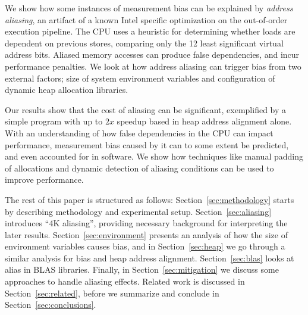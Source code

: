 \documentclass[10pt, conference, compsocconf]{IEEEtran}
\begin{document}
We show how some instances of measurement bias can be explained by \emph{address aliasing}, an artifact of a known Intel specific optimization on the out-of-order execution pipeline.
The CPU uses a heuristic for determining whether loads are dependent on previous stores, comparing only the 12 least significant virtual address bits.
Aliased memory accesses can produce false dependencies, and incur performance penalties.
We look at how address aliasing can trigger bias from two external factors; size of system environment variables and configuration of dynamic heap allocation libraries.

Our results show that the cost of aliasing can be significant, exemplified by a simple program with up to $2x$ speedup based in heap address alignment alone.
With an understanding of how false dependencies in the CPU can impact performance, measurement bias caused by it can to some extent be predicted, and even accounted for in software.
We show how techniques like manual padding of allocations and dynamic detection of aliasing conditions can be used to improve performance. 

The rest of this paper is structured as follows:
Section~\ref{sec:methodology} starts by describing methodology and experimental setup.
Section~\ref{sec:aliasing} introduces ``4K aliasing'', providing necessary background for interpreting the later results.
Section~\ref{sec:environment} presents an analysis of how the size of environment variables causes bias, and in Section~\ref{sec:heap} we go through a similar analysis for bias and heap address alignment.
Section~\ref{sec:blas} looks at alias in BLAS libraries.
Finally, in Section~\ref{sec:mitigation} we discuss some approaches to handle aliasing effects.
Related work is discussed in Section~\ref{sec:related}, before we summarize and conclude in Section~\ref{sec:conclusions}.
\end{document}
